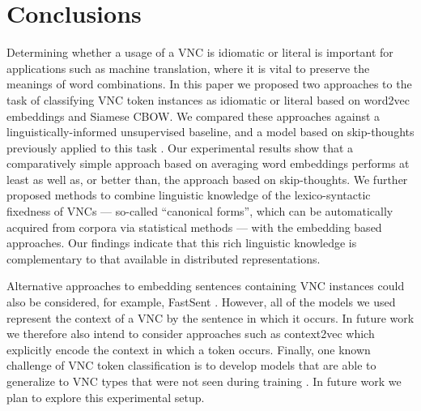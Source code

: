 \documentclass[11pt,a4paper]{article}
\begin{document}
\section{Conclusions}\label{conclusion}

Determining whether a usage of a VNC is idiomatic or literal is
important for applications such as machine translation, where it is
vital to preserve the meanings of word combinations. 
In this paper we proposed two approaches to the task of classifying
VNC token instances as idiomatic or literal based on word2vec
embeddings and Siamese CBOW. We compared these approaches against a
linguistically-informed unsupervised baseline, and a model based on
skip-thoughts previously applied to this task
\citep{salton-ross-kelleher}. Our experimental results show that a
comparatively simple approach based on averaging word embeddings
performs at least as well as, or better than, the approach based on
skip-thoughts. We further proposed methods to combine linguistic
knowledge of the lexico-syntactic fixedness of VNCs --- so-called
``canonical forms'', which can be automatically acquired from corpora
via statistical methods --- with the embedding based approaches. Our
findings indicate that this rich linguistic knowledge is complementary
to that available in distributed representations.


Alternative approaches to embedding sentences containing VNC
instances could also be considered, for example, FastSent
\citep{Hill+:2016}. However, all of the models we used represent the
context of a VNC by the sentence in which it occurs. In future work we
therefore also intend to consider approaches such as context2vec
\citep{melamud2016context2vec} which explicitly encode the context in
which a token occurs. Finally, one known challenge of VNC token
classification is to develop models that are able to generalize to VNC
types that were not seen during training \citep{gharbieh+:2016}. In
future work we plan to explore this experimental setup.








\end{document}
